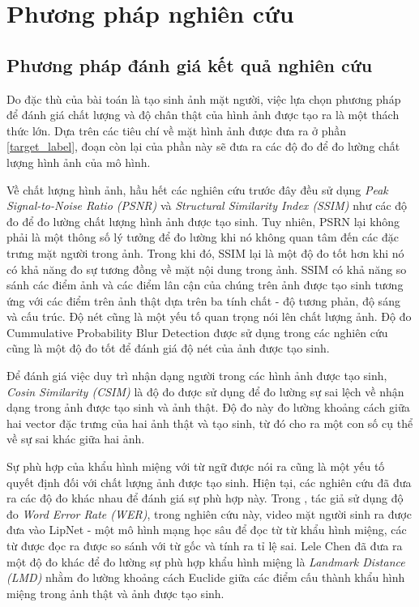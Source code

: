\section{\texorpdfstring{Phương pháp nghiên cứu}{Method}}
\subsection{\texorpdfstring{Phương pháp đánh giá kết quả nghiên cứu}{Empty}}\label{sec:metrics_eval}
Do đặc thù của bài toán là tạo sinh ảnh mặt người, việc lựa chọn phương pháp để đánh giá chất lượng và độ chân thật của hình ảnh được tạo ra là một thách thức lớn. Dựa trên các tiêu chí về mặt hình ảnh được đưa ra ở phần \ref{target_label}, đoạn còn lại của phần này sẽ đưa ra các độ đo để đo lường chất lượng hình ảnh của mô hình.

Về chất lượng hình ảnh, hầu hết các nghiên cứu trước đây \cite{chen2018}\cite{chen2019}\cite{vougioukas2019}\cite{vougioukas2020} đều sử dụng \textit{Peak Signal-to-Noise Ratio (PSNR)} và \textit{Structural Similarity Index (SSIM)} như các độ đo để đo lường chất lượng hình ảnh được tạo sinh. Tuy nhiên, PSRN lại không phải là một thông số lý tưởng để đo lường khi nó không quan tâm đến các đặc trưng mặt người trong ảnh. Trong khi đó, SSIM lại là một độ đo tốt hơn khi nó có khả năng đo sự tương đồng về mặt nội dung trong ảnh. SSIM có khả năng so sánh các điểm ảnh và các điểm lân cận của chúng trên ảnh được tạo sinh tương ứng với các điểm trên ảnh thật dựa trên ba tính chất - độ tương phản, độ sáng và cấu trúc. Độ nét cũng là một yếu tố quan trọng nói lên chất lượng ảnh. Độ đo Cummulative Probability Blur Detection được sử dụng trong các nghiên cứu \cite{chen2018}\cite{vougioukas2019}\cite{vougioukas2020}
cũng là một độ đo tốt để đánh giá độ nét của ảnh được tạo sinh.

Để đánh giá việc duy trì nhận dạng người trong các hình ảnh được tạo sinh, \textit{Cosin Similarity (CSIM)} là độ đo được sử dụng để đo lường sự sai lệch về nhận dạng trong ảnh được tạo sinh và ảnh thật. Độ đo này đo lường khoảng cách giữa hai vector đặc trưng của hai ảnh thật và tạo sinh, từ đó cho ra một con số cụ thể về sự sai khác giữa hai ảnh.

Sự phù hợp của khẩu hình miệng với từ ngữ được nói ra cũng là một yếu tố quyết định đối với chất lượng ảnh được tạo sinh. Hiện tại, các nghiên cứu đã đưa ra các độ đo khác nhau để đánh giá sự phù hợp này. Trong \cite{vougioukas2019}\cite{vougioukas2020}, tác giả sử dụng độ đo \textit{Word Error Rate (WER)}, trong nghiên cứu này, video mặt người sinh ra được đưa vào LipNet - một mô hình mạng học sâu để đọc từ từ khẩu hình miệng, các từ được đọc ra được so sánh với từ gốc và tính ra tỉ lệ sai. Lele Chen \cite{chen2018} đã đưa ra một độ đo khác để đo lường sự phù hợp khẩu hình miệng là \textit{Landmark Distance (LMD)} nhằm đo lường khoảng cách Euclide giữa các điểm cấu thành khẩu hình miệng trong ảnh thật và ảnh được tạo sinh.

